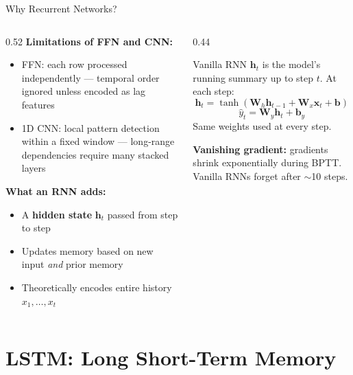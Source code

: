 \documentclass[aspectratio=169, 11pt]{beamer}
\begin{document}
\begin{frame}{Why Recurrent Networks?}
  \begin{columns}[T]
    \begin{column}{0.52\textwidth}
      \textbf{Limitations of FFN and CNN:}
      \begin{itemize}\footnotesize
        \item FFN: each row processed independently ---
              temporal order ignored unless encoded as lag features
        \item 1D CNN: local pattern detection within a fixed window ---
              long-range dependencies require many stacked layers
      \end{itemize}
      \vspace{0.1cm}
      \textbf{What an RNN adds:}
      \begin{itemize}\footnotesize
        \item A \textbf{hidden state} $\mathbf{h}_t$ passed from step to step
        \item Updates memory based on new input \emph{and} prior memory
        \item Theoretically encodes entire history $x_1, \ldots, x_t$
      \end{itemize}
    \end{column}
    \begin{column}{0.44\textwidth}
      \begin{definitionbox}{Vanilla RNN}
        \small
        $\mathbf{h}_t$ is the model's running summary up to step $t$.
        At each step:
        \[
          \mathbf{h}_t = \tanh(\mathbf{W}_h \mathbf{h}_{t-1} + \mathbf{W}_x \mathbf{x}_t + \mathbf{b})
        \]
        \[
          \hat{y}_t = \mathbf{W}_y \mathbf{h}_t + \mathbf{b}_y
        \]
        Same weights used at every step.
      \end{definitionbox}
      \begin{warningbox}
        \small \textbf{Vanishing gradient:}
        gradients shrink exponentially during BPTT.
        Vanilla RNNs forget after $\sim$10 steps.
      \end{warningbox}
    \end{column}
  \end{columns}
\end{frame}

\section{LSTM: Long Short-Term Memory}
\end{document}
